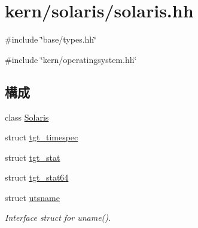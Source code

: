 \hypertarget{kern_2solaris_2solaris_8hh}{
\section{kern/solaris/solaris.hh}
\label{kern_2solaris_2solaris_8hh}
}
{\ttfamily \#include \char`\"{}base/types.hh\char`\"{}}\par
{\ttfamily \#include \char`\"{}kern/operatingsystem.hh\char`\"{}}\par
\subsection*{構成}
\begin{DoxyCompactItemize}
\item 
class \hyperlink{classSolaris}{Solaris}
\item 
struct \hyperlink{structSolaris_1_1tgt__timespec}{tgt\_\-timespec}
\item 
struct \hyperlink{structSolaris_1_1tgt__stat}{tgt\_\-stat}
\item 
struct \hyperlink{structSolaris_1_1tgt__stat64}{tgt\_\-stat64}
\item 
struct \hyperlink{structSolaris_1_1utsname}{utsname}
\begin{DoxyCompactList}\small\item\em Interface struct for uname(). \item\end{DoxyCompactList}\end{DoxyCompactItemize}
